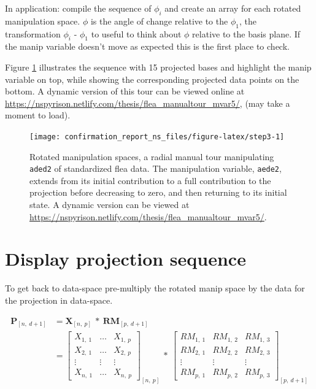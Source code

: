 \documentclass{monashthesis}
\begin{document}
In application: compile the sequence of \(\phi_i\) and create an array
for each rotated manipulation space. \(\phi\) is the angle of change
relative to the \(\phi_1\), the transformation \(\phi_i\) - \(\phi_1\)
to useful to think about \(\phi\) relative to the basis plane. If the
manip variable doesn't move as expected this is the first place to
check.

Figure \ref{fig:step3} illustrates the sequence with 15 projected bases
and highlight the manip variable on top, while showing the corresponding
projected data points on the bottom. A dynamic version of this tour can
be viewed online at
\url{https://nspyrison.netlify.com/thesis/flea_manualtour_mvar5/}, (may
take a moment to load).








\begin{figure}

{\centering \texttt{[image: confirmation\_report\_ns\_files/figure-latex/step3-1]} 

}

\caption{Rotated manipulation spaces, a radial manual tour
manipulating \texttt{aded2} of standardized flea data. The manipulation
variable, \texttt{aede2}, extends from its initial contribution to a
full contribution to the projection before decreasing to zero, and then
returning to its initial state. A dynamic version can be viewed at
\url{https://nspyrison.netlify.com/thesis/flea_manualtour_mvar5/}.}\label{fig:step3}
\end{figure}

\section{Display projection sequence}\label{display-projection-sequence}

To get back to data-space pre-multiply the rotated manip space by the
data for the projection in data-space.

\begin{align}
  \textbf{P}_{[n,~d+1]}
    &= \textbf{X}_{[n,~p]} ~*~ \textbf{RM}_{[p,~d+1]} \\
    &=
      \begin{bmatrix}
          X_{1,~1} & \dots & X_{1,~p} \\
          X_{2,~1} & \dots & X_{2,~p} \\
          \vdots   & \vdots & \vdots  \\
          X_{n,~1} & \dots & X_{n,~p}
      \end{bmatrix}_{[n,~p]}
      ~*~
      \begin{bmatrix}
        RM_{1,~1} & RM_{1,~2} & RM_{1,~3} \\
        RM_{2,~1} & RM_{2,~2} & RM_{2,~3} \\
        \vdots    & \vdots    & \vdots    \\
        RM_{p,~1} & RM_{p,~2} & RM_{p,~3}
      \end{bmatrix}_{[p,~d+1]}
\end{align}
\end{document}
